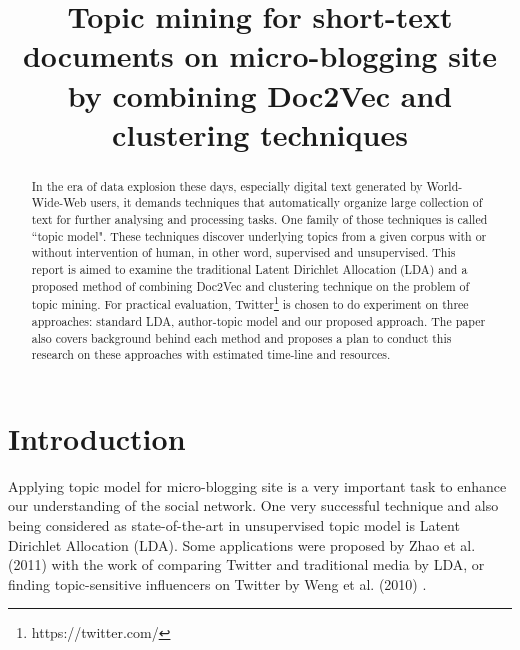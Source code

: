 \documentclass[conference,compsoc]{IEEEtran}
\begin{document}
\title{Topic mining for short-text documents on micro-blogging site\\ by combining Doc2Vec and clustering techniques}


\author{
}

\maketitle

\begin{abstract}
In the era of data explosion these days, especially digital text generated by World-Wide-Web users, it demands techniques that automatically organize large collection of text for further analysing and processing tasks. One family of those techniques is called ``topic model". These techniques discover underlying topics from a given corpus with or without intervention of human, in other word, supervised and unsupervised. This report is aimed to examine the traditional Latent Dirichlet Allocation (LDA) and a proposed method of combining Doc2Vec and clustering technique on the problem of topic mining. For practical evaluation, Twitter\footnote{https://twitter.com/} is chosen to do experiment on three approaches: standard LDA, author-topic model and our proposed approach. The paper also covers background behind each method and proposes a plan to conduct this research on these approaches with estimated time-line and resources.
\end{abstract}


\section{Introduction}

Applying topic model for micro-blogging site is a very important task to enhance our understanding of the social network. One very successful technique and also being considered as state-of-the-art in unsupervised topic model is Latent Dirichlet Allocation (LDA)\cite{Blei2003}. Some applications were proposed by Zhao et al. (2011) \cite{zhao2011comparing} with the work of comparing Twitter and traditional media by LDA, or finding topic-sensitive influencers on Twitter by Weng et al. (2010) \cite{Weng2010}.
\end{document}
